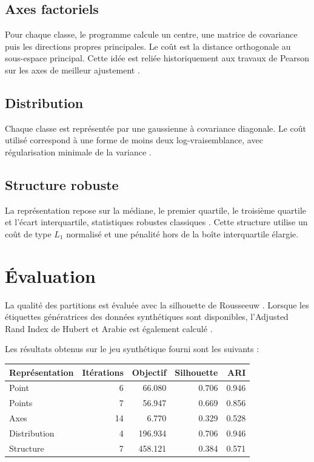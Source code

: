 \documentclass[12pt,a4paper]{article}
\begin{document}
\subsection{Axes factoriels}
Pour chaque classe, le programme calcule un centre, une matrice de covariance puis les directions propres principales. Le coût est la distance orthogonale au sous-espace principal. Cette idée est reliée historiquement aux travaux de Pearson sur les axes de meilleur ajustement \cite{pearson1901}.

\subsection{Distribution}
Chaque classe est représentée par une gaussienne à covariance diagonale. Le coût utilisé correspond à une forme de moins deux log-vraisemblance, avec régularisation minimale de la variance \cite{bishop2006}.

\subsection{Structure robuste}
La représentation repose sur la médiane, le premier quartile, le troisième quartile et l'écart interquartile, statistiques robustes classiques \cite{tukey1977}. Cette structure utilise un coût de type $L_1$ normalisé et une pénalité hors de la boîte interquartile élargie.

\section{Évaluation}
La qualité des partitions est évaluée avec la silhouette de Rousseeuw \cite{rousseeuw1987}. Lorsque les étiquettes génératrices des données synthétiques sont disponibles, l'Adjusted Rand Index de Hubert et Arabie est également calculé \cite{hubert1985}.

Les résultats obtenus sur le jeu synthétique fourni sont les suivants :
\begin{center}
\begin{tabular}{lrrrr}
\toprule
Représentation & Itérations & Objectif & Silhouette & ARI\\
\midrule
Point & 6 & 66.080 & 0.706 & 0.946\\
Points & 7 & 56.947 & 0.669 & 0.856\\
Axes & 14 & 6.770 & 0.329 & 0.528\\
Distribution & 4 & 196.934 & 0.706 & 0.946\\
Structure & 7 & 458.121 & 0.384 & 0.571\\
\bottomrule
\end{tabular}
\end{center}
\end{document}
